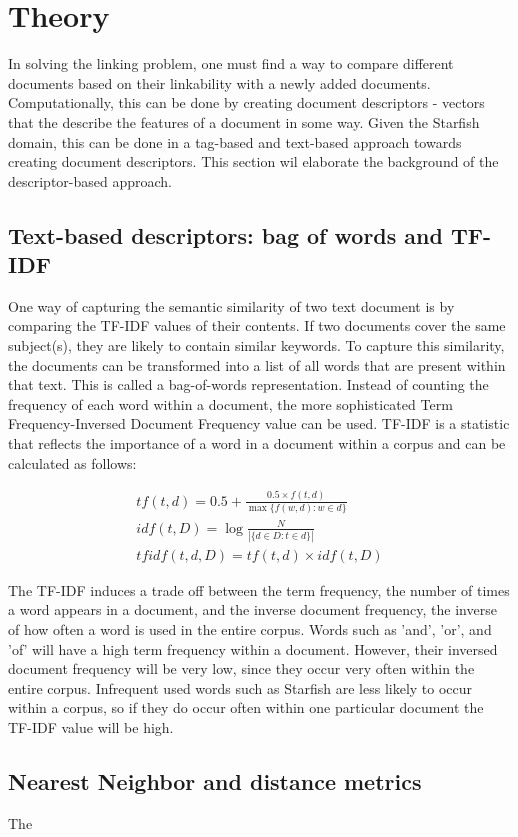 \section{Theory}

In solving the linking problem, one must find a way to compare different documents based on their linkability with a newly added documents. Computationally, this can be done by creating document descriptors - vectors that the describe the features of a document in some way. Given the Starfish domain, this can be done in a tag-based and text-based approach towards creating document descriptors. This section wil elaborate the background of the descriptor-based approach. 

\subsection{Text-based descriptors: bag of words and TF-IDF}
One way of capturing the semantic similarity of two text document is by comparing the TF-IDF values of their contents. If two documents cover the same subject(s), they are likely to contain similar keywords. To capture this similarity, the documents can be transformed into a list of all words that are present within that text. This is called a bag-of-words representation. Instead of counting the frequency of each word within a document, the more sophisticated Term Frequency-Inversed Document Frequency value can be used. TF-IDF is a statistic that reflects the importance of a word in a document within a corpus and can be calculated as follows:

\begin{align}
\nonumber {tf}(t,d) = 0.5 + \frac{0.5 \times {f}(t, d)}{\max\{{f}(w, d):w \in d\}}\\
\nonumber {idf}(t, D) =  \log \frac{N}{|\{d \in D: t \in d\}|}\\
\nonumber {tfidf}(t,d,D) = {tf}(t,d) \times {idf}(t, D)
\end{align}

The TF-IDF induces a trade off between the term frequency, the number of times a word appears in a document, and the inverse document frequency, the inverse of how often a word is used in the entire corpus. Words such as 'and', 'or', and 'of' will have a high term frequency within a document. However, their inversed document frequency will be very low, since they occur very often within the entire corpus. Infrequent used words such as Starfish are less likely to occur within a corpus, so if they do occur often within one particular document the TF-IDF value will be high. 

\subsection{Nearest Neighbor and distance metrics}
The 
